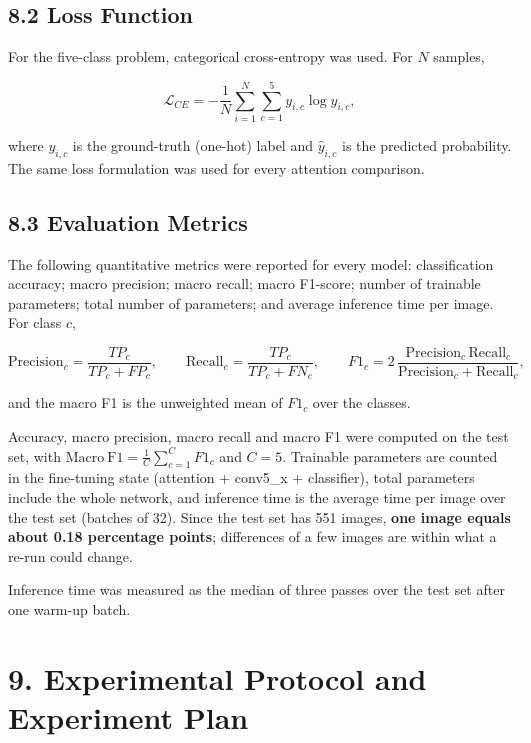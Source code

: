 \documentclass[11pt]{article}
\begin{document}
\subsection*{8.2 Loss Function}

For the five-class problem, categorical cross-entropy was used. For $N$
samples,

\[
\mathcal{L}_{CE}=-\frac{1}{N}\sum_{i=1}^{N}\sum_{c=1}^{5}y_{i,c}\log\hat{y}_{i,c},
\]

where $y_{i,c}$ is the ground-truth (one-hot) label and $\hat{y}_{i,c}$ is the
predicted probability. The same loss formulation was used for every attention
comparison.

\subsection*{8.3 Evaluation Metrics}

The following quantitative metrics were reported for every model:
classification accuracy; macro precision; macro recall; macro F1-score;
number of trainable parameters; total number of parameters; and average
inference time per image. For class $c$,

\[
\mathrm{Precision}_c=\frac{TP_c}{TP_c+FP_c},\qquad
\mathrm{Recall}_c=\frac{TP_c}{TP_c+FN_c},\qquad
F1_c=2\,\frac{\mathrm{Precision}_c\,\mathrm{Recall}_c}{\mathrm{Precision}_c+\mathrm{Recall}_c},
\]

and the macro F1 is the unweighted mean of $F1_c$ over the classes.

Accuracy, macro precision, macro recall and macro F1 were computed on the
test set, with $\mathrm{Macro\ F1}=\frac{1}{C}\sum_{c=1}^{C}F1_c$ and
$C=5$. Trainable parameters are counted in the fine-tuning state (attention
+ conv5\_x + classifier), total parameters include the whole network, and
inference time is the average time per image over the test set (batches of 32).
Since the test set has 551 images, \textbf{one image equals about 0.18
percentage points}; differences of a few images are within what a re-run
could change.

Inference time was measured as the median of three passes over the test set
after one warm-up batch.

\section*{9. Experimental Protocol and Experiment Plan}
\end{document}
